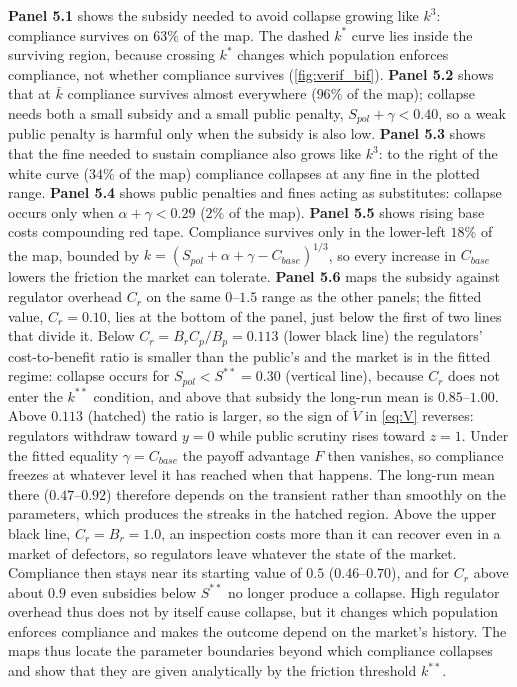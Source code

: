 \documentclass[10pt]{article}
\newcommand{\kbar}{\bar{k}}
\begin{document}
\textbf{Panel 5.1} shows the subsidy needed to avoid collapse growing like $k^3$: compliance survives on $63\%$ of the map. The dashed $k^*$ curve lies inside the surviving region, because crossing $k^*$ changes which population enforces compliance, not whether compliance survives (\cref{fig:verif_bif}). \textbf{Panel 5.2} shows that at $\kbar$ compliance survives almost everywhere ($96\%$ of the map); collapse needs both a small subsidy and a small public penalty, $S_{pol}+\gamma<0.40$, so a weak public penalty is harmful only when the subsidy is also low. \textbf{Panel 5.3} shows that the fine needed to sustain compliance also grows like $k^3$: to the right of the white curve ($34\%$ of the map) compliance collapses at any fine in the plotted range. \textbf{Panel 5.4} shows public penalties and fines acting as substitutes: collapse occurs only when $\alpha+\gamma<0.29$ ($2\%$ of the map). \textbf{Panel 5.5} shows rising base costs compounding red tape. Compliance survives only in the lower-left $18\%$ of the map, bounded by $k=(S_{pol}+\alpha+\gamma-C_{base})^{1/3}$, so every increase in $C_{base}$ lowers the friction the market can tolerate. \textbf{Panel 5.6} maps the subsidy against regulator overhead $C_r$ on the same $0$--$1.5$ range as the other panels; the fitted value, $C_r=0.10$, lies at the bottom of the panel, just below the first of two lines that divide it. Below $C_r=B_rC_p/B_p=0.113$ (lower black line) the regulators' cost-to-benefit ratio is smaller than the public's and the market is in the fitted regime: collapse occurs for $S_{pol}<S^{**}=0.30$ (vertical line), because $C_r$ does not enter the $k^{**}$ condition, and above that subsidy the long-run mean is $0.85$--$1.00$. Above $0.113$ (hatched) the ratio is larger, so the sign of $\dot V$ in \cref{eq:V} reverses: regulators withdraw toward $y=0$ while public scrutiny rises toward $z=1$. Under the fitted equality $\gamma=C_{base}$ the payoff advantage $F$ then vanishes, so compliance freezes at whatever level it has reached when that happens. The long-run mean there ($0.47$--$0.92$) therefore depends on the transient rather than smoothly on the parameters, which produces the streaks in the hatched region. Above the upper black line, $C_r=B_r=1.0$, an inspection costs more than it can recover even in a market of defectors, so regulators leave whatever the state of the market. Compliance then stays near its starting value of $0.5$ ($0.46$--$0.70$), and for $C_r$ above about $0.9$ even subsidies below $S^{**}$ no longer produce a collapse. High regulator overhead thus does not by itself cause collapse, but it changes which population enforces compliance and makes the outcome depend on the market's history. The maps thus locate the parameter boundaries beyond which compliance collapses and show that they are given analytically by the friction threshold $k^{**}$.
\end{document}
